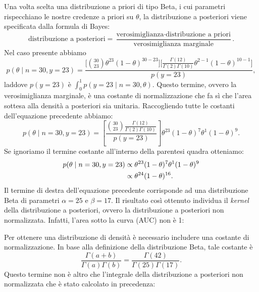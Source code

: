 \documentclass[
  11pt,
  italian,
  a4paper,
  extrafontsizes,onecolumn,openright
  ]{memoir}
\newenvironment{Shaded}{\begin{snugshade}}{\end{snugshade}}
\newcommand{\AttributeTok}[1]{\textcolor[rgb]{0.77,0.63,0.00}{#1}}
\newcommand{\CommentTok}[1]{\textcolor[rgb]{0.56,0.35,0.01}{\textit{#1}}}
\newcommand{\ControlFlowTok}[1]{\textcolor[rgb]{0.13,0.29,0.53}{\textbf{#1}}}
\newcommand{\DecValTok}[1]{\textcolor[rgb]{0.00,0.00,0.81}{#1}}
\newcommand{\FunctionTok}[1]{\textcolor[rgb]{0.00,0.00,0.00}{#1}}
\newcommand{\NormalTok}[1]{#1}
\newcommand{\OtherTok}[1]{\textcolor[rgb]{0.56,0.35,0.01}{#1}}
\newcommand{\SpecialCharTok}[1]{\textcolor[rgb]{0.00,0.00,0.00}{#1}}
\theoremstyle{definition}
\theoremstyle{definition}
\theoremstyle{definition}
\theoremstyle{definition}
\theoremstyle{remark}
\begin{document}
Una volta scelta una distribuzione a priori di tipo Beta, i cui parametri rispecchiano le nostre credenze a priori su \(\theta\), la distribuzione a posteriori viene specificata dalla formula di Bayes:
\[
\text{distribuzione a posteriori} = \frac{\text{verosimiglianza}\cdot\text{distribuzione a priori}}{\text{verosimiglianza marginale}}.
\]
Nel caso presente abbiamo
\[
p(\theta \mid n=30, y=23) = \frac{\Big[\binom{30}{23}\theta^{23}(1-\theta)^{30-23}\Big]\Big[\frac{\Gamma(12)}{\Gamma(2)\Gamma(10)}\theta^{2-1} (1-\theta)^{10-1}\Big]}{p(y = 23)},
\]
laddove \(p(y = 23)\) è \(\int_0^1p(y = 23 \mid n = 30, \theta)\). Questo termine, ovvero la verosimiglianza marginale, è una costante di normalizzazione che fa sì che l'area sottesa alla densità a posteriori sia unitaria.
Raccogliendo tutte le costanti dell'equazione precedente abbiamo:
\[
p(\theta \mid n=30, y=23) =\left[\frac{\binom{30}{23}\frac{\Gamma(12)}{\Gamma(2)\Gamma(10)}}{p(y = 23)}\right] \theta^{23}(1-\theta)^{7}\theta^{1} (1-\theta)^{9}.
\]
Se ignoriamo il termine costante all'interno della parentesi quadra otteniamo:
\begin{align}
p(\theta \mid n=30, y=23) &\propto \theta^{23}(1-\theta)^{7}\theta^{1} (1-\theta)^{9}\notag\\
&\propto \theta^{24}(1-\theta)^{16}.\notag
\end{align}
Il termine di destra dell'equazione precedente corrisponde ad una distribuzione Beta di parametri \(\alpha=25\) e \(\beta = 17\). Il risultato così ottenuto individua il \emph{kernel} della distribuzione a posteriori, ovvero la distribuzione a posteriori non normalizzata. Infatti, l'area sotto la curva (AUC) non è 1:

\begin{Shaded}
\end{Shaded}

\noindent
Per ottenere una distribuzione di densità è necessario includere una costante di normalizzazione. In base alla definizione della distribuzione Beta, tale costante è
\[
\frac{\Gamma(a+b)}{\Gamma(a)\Gamma(b)} = \frac{\Gamma(42)}{\Gamma(25)\Gamma(17)}.
\]
Questo termine non è altro che l'integrale della distribuzione a posteriori non normalizzata che è stato calcolato in precedenza:
\end{document}
